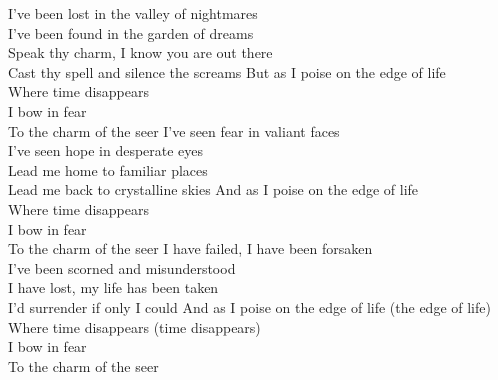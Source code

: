 I've been lost in the valley of nightmares\\
I've been found in the garden of dreams\\
Speak thy charm, I know you are out there\\
Cast thy spell and silence the screams
\hops
{} But as I poise on the edge of life\\
 Where time disappears\\
 I bow in fear\\
 To the charm of the seer
\hops
I've seen fear in valiant faces\\
I've seen hope in desperate eyes\\
Lead me home to familiar places\\
Lead me back to crystalline skies
\hops
{} And as I poise on the edge of life\\
 Where time disappears\\
 I bow in fear\\
 To the charm of the seer
\hops
I have failed, I have been forsaken\\
I've been scorned and misunderstood\\
I have lost, my life has been taken\\
I'd surrender if only I could
\hops
{} And as I poise on the edge of life (the edge of life)\\
 Where time disappears (time disappears)\\
 I bow in fear\\
 To the charm of the seer